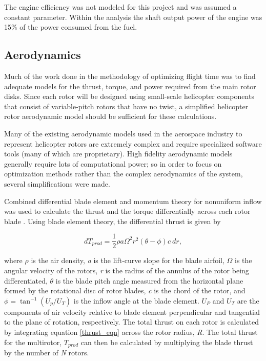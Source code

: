 \documentclass[letterpaper, 10 pt, conference]{ieeeconf}  %
\begin{document}
The engine efficiency was not modeled for this project and was assumed a constant parameter.  Within the analysis the shaft output power of the engine was 15\% of the power consumed from the fuel.  

\subsection{Aerodynamics}

Much of the work done in the methodology of optimizing flight time was to find adequate models for the thrust, torque, and power required from the main rotor disks. Since each rotor will be designed using small-scale helicopter components that consist of variable-pitch rotors that have no twist, a simplified helicopter rotor aerodynamic model should be sufficient for these calculations. 

Many of the existing aerodynamic models used in the aerospace industry to represent helicopter rotors are extremely complex and require specialized software tools (many of which are proprietary). High fidelity aerodynamic models generally require lots of computational power; so in order to focus on optimization methods rather than the complex aerodynamics of the system, several simplifications were made.

Combined differential blade element and momentum theory for nonuniform inflow was used to calculate the thrust and the torque differentially across each rotor blade \cite{bramwell2001bramwell}. Using blade element theory, the differential thrust is given by

\begin{equation}
	dT_{prod} = \frac{1}{2} \rho a \Omega^2 r^2 (\theta - \phi) c \  dr,
	\label{thrust_eqn}
\end{equation}

where $\rho$ is the air density, \textit{a} is the lift-curve slope for the blade airfoil, $\Omega$ is the angular velocity of the rotors, \textit{r} is the radius of the annulus of the rotor being differentiated, $\theta$ is the blade pitch angle measured from the horizontal plane formed by the rotational disc of rotor blades, \textit{c} is the chord of the rotor, and $\phi = \tan^{-1}(U_p/U_T) $ is the inflow angle at the blade element. $U_P$ and $U_T$ are the components of air velocity relative to blade element perpendicular and tangential to the plane of rotation, respectively. The total thrust on each rotor is calculated by integrating equation \ref{thrust_eqn} across the rotor radius, \textit{R}. The total thrust for the multirotor, $T_{prod}$ can then be calculated by multiplying the blade thrust by the number of \textit{N} rotors. 
\end{document}
